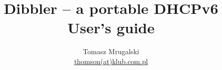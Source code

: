 \documentclass[11pt]{article}
\author{Tomasz Mrugalski\\ \small{\href{mailto:thomson(at)klub.com.pl}{thomson(at)klub.com.pl}}}
\date{\dzis}
\title{Dibbler -- a portable DHCPv6\\User's guide}
\begin{document}
\vspace{-4cm}
\maketitle
\vspace{-1cm}

\begin{center}
  
\end{center}

\newpage
\tableofcontents

\newpage














\end{document}
